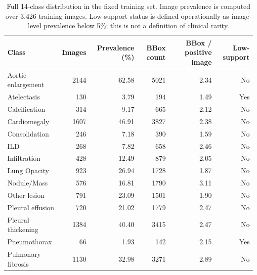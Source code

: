 \begin{table}[htbp]
\centering
\caption{Full 14-class distribution in the fixed training set. Image prevalence is computed over 3,426 training images. Low-support status is defined operationally as image-level prevalence below 5\%; this is not a definition of clinical rarity.}
\label{tab:supp_class_distribution}
\small
\setlength{\tabcolsep}{5pt}
\renewcommand{\arraystretch}{1.05}
\begin{tabular}{lrrrrr}
\toprule
\textbf{Class} & \textbf{Images} & \textbf{Prevalence (\%)} & \textbf{BBox count} & \textbf{BBox / positive image} & \textbf{Low-support} \\
\midrule
Aortic enlargement & 2144 & 62.58 & 5021 & 2.34 & No \\
Atelectasis & 130 & 3.79 & 194 & 1.49 & Yes \\
Calcification & 314 & 9.17 & 665 & 2.12 & No \\
Cardiomegaly & 1607 & 46.91 & 3827 & 2.38 & No \\
Consolidation & 246 & 7.18 & 390 & 1.59 & No \\
ILD & 268 & 7.82 & 658 & 2.46 & No \\
Infiltration & 428 & 12.49 & 879 & 2.05 & No \\
Lung Opacity & 923 & 26.94 & 1728 & 1.87 & No \\
Nodule/Mass & 576 & 16.81 & 1790 & 3.11 & No \\
Other lesion & 791 & 23.09 & 1501 & 1.90 & No \\
Pleural effusion & 720 & 21.02 & 1779 & 2.47 & No \\
Pleural thickening & 1384 & 40.40 & 3415 & 2.47 & No \\
Pneumothorax & 66 & 1.93 & 142 & 2.15 & Yes \\
Pulmonary fibrosis & 1130 & 32.98 & 3271 & 2.89 & No \\
\bottomrule
\end{tabular}
\end{table}
